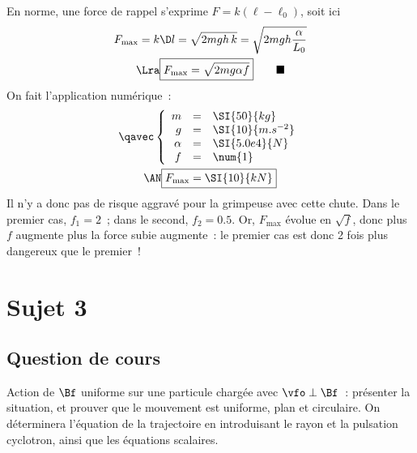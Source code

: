 \documentclass[a4paper, 11pt]{book}
\newcommand{\qed}{\tag*{$\blacksquare$}}
\renewcommand{\a}[0]{\alpha}
\begin{document}
{En norme, une force de rappel s'exprime $F = k(\ell -\ell_0)$, soit
    ici
    \begin{gather*}
        F_{\max} = k\D l = \sqrt{2mgh\,k} = \sqrt{2mgh\frac{\a}{L_0}}
        \\\Lra
        \boxed{F_{\max} = \sqrt{2mg\a f}}
        \qed
    \end{gather*}
}
{On fait l'application numérique~:
    \begin{gather*}
        \qavec
        \left\{
            \begin{array}{rcl}
                m & = & \SI{50}{kg}\\
                g & = & \SI{10}{m.s^{-2}}\\
                \a & = & \SI{5.0e4}{N}\\
                f & = & \num{1}
            \end{array}
        \right.\\
        \AN
        \boxed{F_{\max} = \SI{10}{kN}}
    \end{gather*}
    Il n'y a donc pas de risque aggravé pour la grimpeuse avec cette chute.
}
{Dans le premier cas, $f_1 = 2$~; dans le second, $f_2 = \num{0.5}$. Or,
$F_{\max}$ évolue en $\sqrt{f}$, donc plus $f$ augmente plus la force
subie augmente~: le premier cas est donc 2 fois plus dangereux que le
premier~!
}

\chapter{Sujet 3}
\section{Question de cours}

Action de $\Bf$ uniforme sur une particule chargée avec $\vfo\perp\Bf$~:
présenter la situation, et prouver que le mouvement est uniforme, plan et
circulaire. On déterminera l'équation de la trajectoire en introduisant le rayon
et la pulsation cyclotron, ainsi que les équations scalaires.

\resetQ
\end{document}
